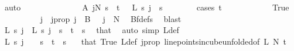 \begin{isabellebody}
\ auto\isanewline
\ \ \ \ \ \ \isamarkupfalse%
\isanewline
\isanewline
\isanewline
\ \ \ \ \ \ \isamarkupfalse%
\ A{}{\isacharcolon}{\kern0pt}\ {\isachardoublequoteopen}{\isacharparenleft}{\kern0pt}{\isasymexists}j{\isacharless}{\kern0pt}N{\isacharprime}{\kern0pt}{\isachardot}{\kern0pt}\ {\isacharparenleft}{\kern0pt}{\isasymforall}s\ {\isacharless}{\kern0pt}\ {\isacharparenleft}{\kern0pt}t\ {\isacharplus}{\kern0pt}\ {}{\isacharparenright}{\kern0pt}{\isachardot}{\kern0pt}\ L{\isacharprime}{\kern0pt}\ s\ j\ {\isacharequal}{\kern0pt}\ s{\isacharparenright}{\kern0pt}{\isacharparenright}{\kern0pt}{\isachardoublequoteclose}\isanewline
\ \ \ \ \ \ \isamarkupfalse%
\ {\isacharparenleft}{\kern0pt}cases\ {\isachardoublequoteopen}t\ {\isacharequal}{\kern0pt}\ {}{\isachardoublequoteclose}{\isacharparenright}{\kern0pt}\isanewline
\ \ \ \ \ \ \ \ \isamarkupfalse%
\ True\isanewline
\ \ \ \ \ \ \ \ \isamarkupfalse%
\ j\ \ j{\isacharunderscore}{\kern0pt}prop{\isacharcolon}{\kern0pt}\ {\isachardoublequoteopen}j\ {\isasymin}\ B\ {}\ {\isasymand}\ j\ {\isacharless}{\kern0pt}\ N{\isacharprime}{\kern0pt}{\isachardoublequoteclose}\ \isamarkupfalse%
\ Bf{\isacharunderscore}{\kern0pt}defs\ \isamarkupfalse%
\ blast\isanewline
\ \ \ \ \ \ \ \ \isamarkupfalse%
\ \isamarkupfalse%
\ {\isachardoublequoteopen}L{\isacharprime}{\kern0pt}\ s\ j\ {\isacharequal}{\kern0pt}\ L\ s\ j{\isachardoublequoteclose}\ \ {\isachardoublequoteopen}s\ {\isacharless}{\kern0pt}\ t{\isachardoublequoteclose}\ \ s\ \isamarkupfalse%
\ that\ \isamarkupfalse%
\ {\isacharparenleft}{\kern0pt}auto\ simp{\isacharcolon}{\kern0pt}\ L{\isacharprime}{\kern0pt}{\isacharunderscore}{\kern0pt}def{\isacharparenright}{\kern0pt}\isanewline
\ \ \ \ \ \ \ \ \isamarkupfalse%
\ \isamarkupfalse%
\ {\isachardoublequoteopen}L\ s\ j\ {\isacharequal}{\kern0pt}\ {}{\isachardoublequoteclose}\ \ {\isachardoublequoteopen}s\ {\isacharless}{\kern0pt}\ t{\isachardoublequoteclose}\ \ s\ \ \isamarkupfalse%
\ that\ True\ L{\isacharunderscore}{\kern0pt}def\ j{\isacharunderscore}{\kern0pt}prop\ line{\isacharunderscore}{\kern0pt}points{\isacharunderscore}{\kern0pt}in{\isacharunderscore}{\kern0pt}cube{\isacharunderscore}{\kern0pt}unfolded{\isacharbrackleft}{\kern0pt}of\ L\ N{\isacharprime}{\kern0pt}\ t{\isacharbrackright}{\kern0pt}\ \isamarkupfalse%

\end{isabellebody}
